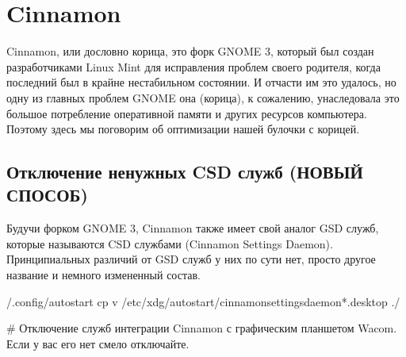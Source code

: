 \documentclass[letterpaper,10pt,russian,openany]{sphinxmanual}
\begin{document}
\ignorespaces 

\section{Cinnamon}
\label{\detokenize{source/de-optimizations:cinnamon}}\label{\detokenize{source/de-optimizations:cinnamon-optimization}}\label{\detokenize{source/de-optimizations:index-22}}
\sphinxAtStartPar
Cinnamon, или дословно корица, это форк GNOME 3, который был создан разработчиками Linux Mint для исправления проблем своего родителя,
когда последний был в крайне нестабильном состоянии.
И отчасти им это удалось, но одну из главных проблем GNOME она (корица), к сожалению, унаследовала \sphinxhyphen{}
это большое потребление оперативной памяти и других ресурсов компьютера.
Поэтому здесь мы поговорим об оптимизации нашей булочки с корицей.

\ignorespaces 

\subsection{Отключение ненужных CSD служб (НОВЫЙ СПОСОБ)}
\label{\detokenize{source/de-optimizations:csd}}\label{\detokenize{source/de-optimizations:disabling-cinnamon-daemons}}\label{\detokenize{source/de-optimizations:index-23}}
\sphinxAtStartPar
Будучи форком GNOME 3, Cinnamon также имеет свой аналог GSD служб, которые называются CSD службами (Cinnamon Settings Daemon).
Принципиальных различий от GSD служб у них по сути нет, просто другое название и немного измененный состав.

\begin{sphinxVerbatim}[commandchars=\\\{\}]
 \PYGZti{}/.config/autostart 
cp \PYGZhy{}v /etc/xdg/autostart/cinnamon\PYGZhy{}settings\PYGZhy{}daemon\PYGZhy{}*.desktop ./ 
\end{sphinxVerbatim}

\sphinxAtStartPar
\# Отключение служб интеграции Cinnamon с графическим планшетом Wacom.
Если у вас его нет \sphinxhyphen{} смело отключайте.
\end{document}
